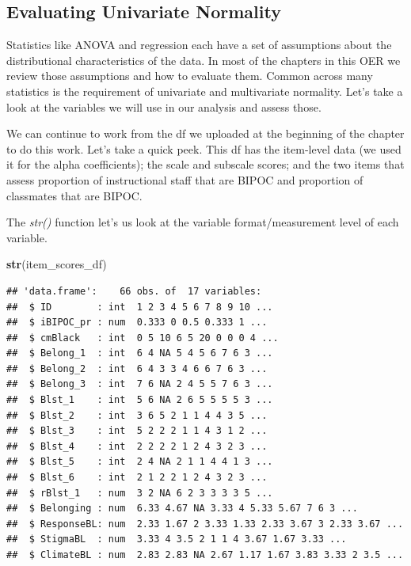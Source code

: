 \documentclass[
  11pt,
]{book}
\newenvironment{Shaded}{\begin{snugshade}}{\end{snugshade}}
\newcommand{\FunctionTok}[1]{\textcolor[rgb]{0.27,0.27,0.27}{\textbf{#1}}}
\newcommand{\NormalTok}[1]{#1}
\begin{document}
\hypertarget{evaluating-univariate-normality}{%
\subsection{Evaluating Univariate Normality}\label{evaluating-univariate-normality}}

Statistics like ANOVA and regression each have a set of assumptions about the distributional characteristics of the data. In most of the chapters in this OER we review those assumptions and how to evaluate them. Common across many statistics is the requirement of univariate and multivariate normality. Let's take a look at the variables we will use in our analysis and assess those.

We can continue to work from the df we uploaded at the beginning of the chapter to do this work. Let's take a quick peek. This df has the item-level data (we used it for the alpha coefficients); the scale and subscale scores; and the two items that assess proportion of instructional staff that are BIPOC and proportion of classmates that are BIPOC.

The \emph{str()} function let's us look at the variable format/measurement level of each variable.

\begin{Shaded}
\begin{Highlighting}[]
\FunctionTok{str}\NormalTok{(item\_scores\_df)}
\end{Highlighting}
\end{Shaded}

\begin{verbatim}
## 'data.frame':    66 obs. of  17 variables:
##  $ ID        : int  1 2 3 4 5 6 7 8 9 10 ...
##  $ iBIPOC_pr : num  0.333 0 0.5 0.333 1 ...
##  $ cmBlack   : int  0 5 10 6 5 20 0 0 0 4 ...
##  $ Belong_1  : int  6 4 NA 5 4 5 6 7 6 3 ...
##  $ Belong_2  : int  6 4 3 3 4 6 6 7 6 3 ...
##  $ Belong_3  : int  7 6 NA 2 4 5 5 7 6 3 ...
##  $ Blst_1    : int  5 6 NA 2 6 5 5 5 5 3 ...
##  $ Blst_2    : int  3 6 5 2 1 1 4 4 3 5 ...
##  $ Blst_3    : int  5 2 2 2 1 1 4 3 1 2 ...
##  $ Blst_4    : int  2 2 2 2 1 2 4 3 2 3 ...
##  $ Blst_5    : int  2 4 NA 2 1 1 4 4 1 3 ...
##  $ Blst_6    : int  2 1 2 2 1 2 4 3 2 3 ...
##  $ rBlst_1   : num  3 2 NA 6 2 3 3 3 3 5 ...
##  $ Belonging : num  6.33 4.67 NA 3.33 4 5.33 5.67 7 6 3 ...
##  $ ResponseBL: num  2.33 1.67 2 3.33 1.33 2.33 3.67 3 2.33 3.67 ...
##  $ StigmaBL  : num  3.33 4 3.5 2 1 1 4 3.67 1.67 3.33 ...
##  $ ClimateBL : num  2.83 2.83 NA 2.67 1.17 1.67 3.83 3.33 2 3.5 ...
\end{verbatim}
\end{document}
